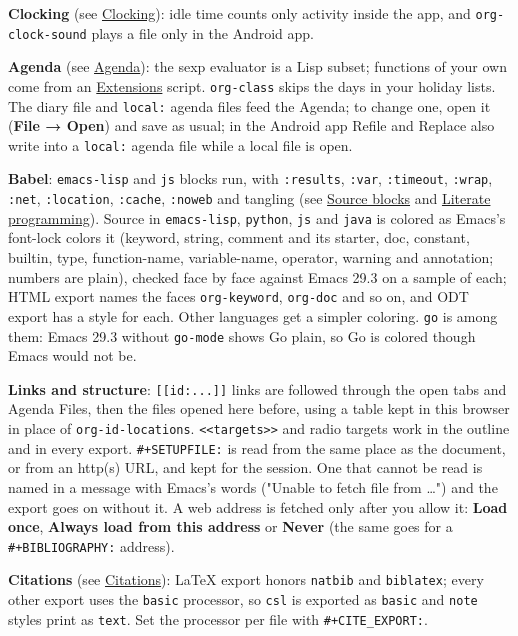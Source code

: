 \documentclass[11pt]{article}
\begin{document}
\textbf{Clocking} (see \hyperref[sec:org6e1340d]{Clocking}): idle time counts only activity inside the app, and \texttt{org-clock-sound} plays a file only in the Android app.

\textbf{Agenda} (see \hyperref[sec:org38ac5a3]{Agenda}): the sexp evaluator is a Lisp subset; functions of your own come from an \hyperref[sec:orgd63a52b]{Extensions} script. \texttt{org-class} skips the days in your holiday lists. The diary file and \texttt{local:} agenda files feed the Agenda; to change one, open it (\textbf{File → Open}) and save as usual; in the Android app Refile and Replace also write into a \texttt{local:} agenda file while a local file is open.

\textbf{Babel}: \texttt{emacs-lisp} and \texttt{js} blocks run, with \texttt{:results}, \texttt{:var}, \texttt{:timeout}, \texttt{:wrap}, \texttt{:net}, \texttt{:location}, \texttt{:cache}, \texttt{:noweb} and tangling (see \hyperref[sec:org2fd54e4]{Source blocks} and \hyperref[sec:org7b4b28a]{Literate programming}). Source in \texttt{emacs-lisp}, \texttt{python}, \texttt{js} and \texttt{java} is colored as Emacs's font-lock colors it (keyword, string, comment and its starter, doc, constant, builtin, type, function-name, variable-name, operator, warning and annotation; numbers are plain), checked face by face against Emacs 29.3 on a sample of each; HTML export names the faces \texttt{org-keyword}, \texttt{org-doc} and so on, and ODT export has a style for each. Other languages get a simpler coloring. \texttt{go} is among them: Emacs 29.3 without \texttt{go-mode} shows Go plain, so Go is colored though Emacs would not be.

\textbf{Links and structure}: \texttt{[[id:...]]} links are followed through the open tabs and Agenda Files, then the files opened here before, using a table kept in this browser in place of \texttt{org-id-locations}. \texttt{<{}<{}targets>{}>{}} and radio targets work in the outline and in every export. \texttt{\#+SETUPFILE:} is read from the same place as the document, or from an http(s) URL, and kept for the session. One that cannot be read is named in a message with Emacs's words ("Unable to fetch file from …") and the export goes on without it. A web address is fetched only after you allow it: \textbf{Load once}, \textbf{Always load from this address} or \textbf{Never} (the same goes for a \texttt{\#+BIBLIOGRAPHY:} address).

\textbf{Citations} (see \hyperref[sec:org1a3b79e]{Citations}): \LaTeX{} export honors \texttt{natbib} and \texttt{biblatex}; every other export uses the \texttt{basic} processor, so \texttt{csl} is exported as \texttt{basic} and \texttt{note} styles print as \texttt{text}. Set the processor per file with \texttt{\#+CITE\_EXPORT:}.
\end{document}
